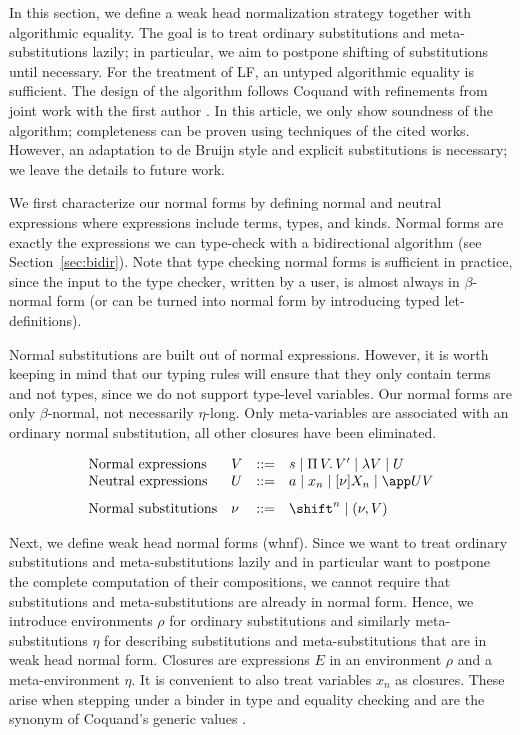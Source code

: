 \documentclass[copyright,creativecommons]{eptcs}
\newcommand{\LONGVERSION}[1]{}
\newcommand{\shiftby}[1]{\shift^{#1}}
\newcommand{\esub}[1]{[#1]}
\begin{document}
In this section, we define a weak head normalization strategy together
with algorithmic equality. The goal is to treat ordinary substitutions
and meta-substitutions lazily; in particular, we aim to postpone
shifting of substitutions until necessary.  
For the treatment of LF, an untyped algorithmic equality is
sufficient.  The design of the algorithm follows Coquand 
\cite{coquand:conversion} with refinements from joint work with the
first author \cite{abelCoquand:lfsigma}.  In this article, we only
show soundness of the algorithm; completeness can be proven using
techniques of the cited works.  However, an adaptation to de Bruijn
style and explicit substitutions is necessary; 
we leave the details to future work\LONGVERSION{, a sketch can be found in the appendix}.



We first characterize
our normal forms by defining normal and neutral expressions where
expressions include terms, types, and kinds. 
Normal forms are exactly the expressions we can type-check with a
bidirectional algorithm (see Section~\ref{sec:bidir}).  Note that type
checking normal forms is sufficient in practice, since the input to
the type checker, written by a user, is almost always in
$\beta$-normal form (or can be turned into normal form by introducing
typed let-definitions).

Normal substitutions are
built out of normal expressions. However, it is worth keeping in mind
that our typing rules will ensure that they only contain terms and
not types, since we do not support type-level variables. Our normal
forms are only $\beta$-normal, not necessarily $\eta$-long. Only
meta-variables are associated with an ordinary normal substitution,
all other closures have been eliminated.   

\[
\begin{array}{llrl}
\mbox{Normal expressions} &
  V & ::= & s \mid \fun V V' \mid \lambda V \mid U 
\\
\mbox{Neutral expressions} &
  U & ::= & a \mid x_n \mid \esub \nu {X_n} \mid \app U V 
\\[0.75em]
\mbox{Normal substitutions} &
  \nu & ::= & \shiftby n \mid (\nu, V)
\end{array}
\]

Next, we define weak head normal forms (whnf). 
Since we want to treat
ordinary substitutions and meta-substitutions lazily and in particular
want to postpone the complete computation of their compositions, 
we cannot require
that substitutions and meta-substitutions are already in normal
form. Hence, we introduce environments $\rho$ for ordinary
substitutions and similarly meta-substitutions $\eta$ for describing
substitutions and meta-substitutions that are in weak head
normal form. 
Closures are expressions $E$ in an environment $\rho$ and
a meta-environment $\eta$.  It is convenient to also treat variables
$x_n$ as closures. These arise when stepping under a binder in type
and equality checking and are the synonym of Coquand's generic values
\cite{coquand:type}.
\end{document}
